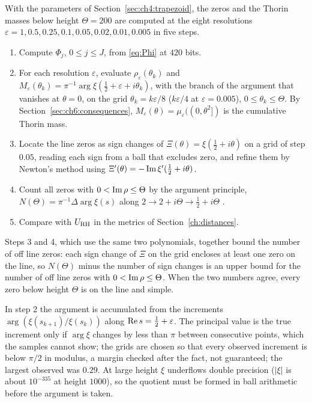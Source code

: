 With the parameters of Section~\ref{sec:ch4:trapezoid}, the zeros and the Thorin masses below height $\Theta=200$ are computed at the eight resolutions $\varepsilon=1,\allowbreak0.5,\allowbreak0.25,\allowbreak0.1,\allowbreak0.05,\allowbreak0.02,\allowbreak0.01,\allowbreak0.005$ in five steps.
\begin{enumerate}
\item Compute $\Phi_j$, $0\le j\le J$, from \eqref{eq:Phi} at $420$ bits.
\item For each resolution $\varepsilon$, evaluate $\rho_\varepsilon(\theta_k)$ and $M_\varepsilon(\theta_k)=\pi^{-1}\arg\xi(\tfrac12+\varepsilon+i\theta_k)$, with the branch of the argument that vanishes at $\theta=0$, on the grid $\theta_k=k\varepsilon/8$ ($k\varepsilon/4$ at $\varepsilon=0.005$), $0\le\theta_k\le\Theta$. By Section~\ref{sec:ch6:consequences}, $M_\varepsilon(\theta)=\mu_\varepsilon((0,\theta^2])$ is the cumulative Thorin mass.
\item Locate the line zeros as sign changes of $\Xi(\theta)=\xi(\tfrac12+i\theta)$ on a grid of step $0.05$, reading each sign from a ball that excludes zero, and refine them by Newton's method using $\Xi'(\theta)=-\operatorname{Im}\xi'(\tfrac12+i\theta)$.
\item Count all zeros with $0<\operatorname{Im}\rho\le\Theta$ by the argument principle, $N(\Theta)=\pi^{-1}\Delta\arg\xi(s)$ along $2\to2+i\Theta\to\tfrac12+i\Theta$ \cite[Section 9.3]{Titchmarsh}.
\item Compare with $U_{\mathrm{RH}}$ in the metrics of Section~\ref{ch:distances}.
\end{enumerate}
Steps 3 and 4, which use the same two polynomials, together bound the number of off line zeros: each sign change of $\Xi$ on the grid encloses at least one zero on the line, so $N(\Theta)$ minus the number of sign changes is an upper bound for the number of off line zeros with $0<\operatorname{Im}\rho\le\Theta$. When the two numbers agree, every zero below height $\Theta$ is on the line and simple.

In step 2 the argument is accumulated from the increments $\arg(\xi(s_{k+1})/\xi(s_k))$ along $\operatorname{Re} s=\frac12+\varepsilon$. The principal value is the true increment only if $\arg\xi$ changes by less than $\pi$ between consecutive points, which the samples cannot show; the grids are chosen so that every observed increment is below $\pi/2$ in modulus, a margin checked after the fact, not guaranteed; the largest observed was $0.29$. At large height $\xi$ underflows double precision ($|\xi|$ is about $10^{-335}$ at height $1000$), so the quotient must be formed in ball arithmetic before the argument is taken.

